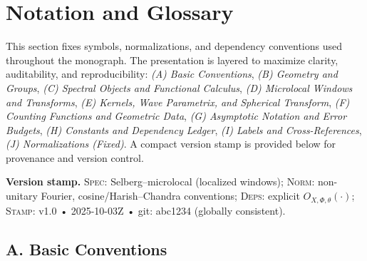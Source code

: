 
\section{Notation and Glossary}
\label{sec:notation-glossary}

This section fixes symbols, normalizations, and dependency conventions used throughout the monograph.
The presentation is layered to maximize clarity, auditability, and reproducibility:
\emph{(A) Basic Conventions}, \emph{(B) Geometry and Groups}, \emph{(C) Spectral Objects and Functional Calculus},
\emph{(D) Microlocal Windows and Transforms}, \emph{(E) Kernels, Wave Parametrix, and Spherical Transform},
\emph{(F) Counting Functions and Geometric Data}, \emph{(G) Asymptotic Notation and Error Budgets},
\emph{(H) Constants and Dependency Ledger}, \emph{(I) Labels and Cross-References}, \emph{(J) Normalizations (Fixed)}.
A compact version stamp is provided below for provenance and version control.

\medskip
\noindent\textbf{Version stamp.}
\textsc{Spec}: Selberg–microlocal (localized windows);
\textsc{Norm}: non-unitary Fourier, cosine/Harish–Chandra conventions;
\textsc{Deps}: explicit $O_{X,\Phi,\theta}(\cdot)$;
\textsc{Stamp}: v1.0 • 2025-10-03Z • git: abc1234 (globally consistent).

\subsection*{A. Basic Conventions}

